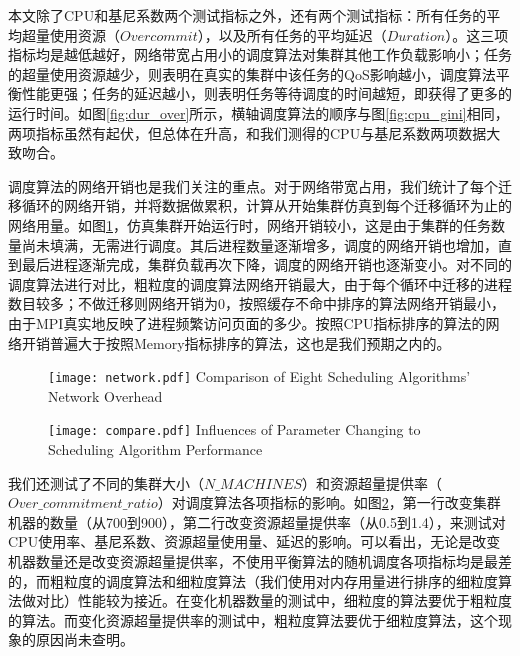 本文除了CPU和基尼系数两个测试指标之外，还有两个测试指标：所有任务的平均超量使用资源（$Overcommit$），以及所有任务的平均延迟（$Duration$）。这三项指标均是越低越好，网络带宽占用小的调度算法对集群其他工作负载影响小；任务的超量使用资源越少，则表明在真实的集群中该任务的QoS影响越小，调度算法平衡性能更强；任务的延迟越小，则表明任务等待调度的时间越短，即获得了更多的运行时间。如图\ref{fig:dur_over}所示，横轴调度算法的顺序与图\ref{fig:cpu_gini}相同，两项指标虽然有起伏，但总体在升高，和我们测得的CPU与基尼系数两项数据大致吻合。

调度算法的网络开销也是我们关注的重点。对于网络带宽占用，我们统计了每个迁移循环的网络开销，并将数据做累积，计算从开始集群仿真到每个迁移循环为止的网络用量。如图\ref{fig:minetwork}，仿真集群开始运行时，网络开销较小，这是由于集群的任务数量尚未填满，无需进行调度。其后进程数量逐渐增多，调度的网络开销也增加，直到最后进程逐渐完成，集群负载再次下降，调度的网络开销也逐渐变小。对不同的调度算法进行对比，粗粒度的调度算法网络开销最大，由于每个循环中迁移的进程数目较多；不做迁移则网络开销为0，按照缓存不命中排序的算法网络开销最小，由于MPI真实地反映了进程频繁访问页面的多少。按照CPU指标排序的算法的网络开销普遍大于按照Memory指标排序的算法，这也是我们预期之内的。
\begin{figure}[!htp]
  \centering
  \texttt{[image: network.pdf]}
    {Comparison of Eight Scheduling Algorithms' Network Overhead}
  \label{fig:minetwork}
\end{figure}

\begin{figure}[!htp]
  \centering
  \texttt{[image: compare.pdf]}
    {Influences of Parameter Changing to Scheduling Algorithm Performance}
  \label{fig:comparing}
\end{figure}

我们还测试了不同的集群大小（$N\_MACHINES$）和资源超量提供率（$Over\_commitment\_ratio$）对调度算法各项指标的影响。如图\ref{fig:comparing}，第一行改变集群机器的数量（从700到900），第二行改变资源超量提供率（从0.5到1.4），来测试对CPU使用率、基尼系数、资源超量使用量、延迟的影响。可以看出，无论是改变机器数量还是改变资源超量提供率，不使用平衡算法的随机调度各项指标均是最差的，而粗粒度的调度算法和细粒度算法（我们使用对内存用量进行排序的细粒度算法做对比）性能较为接近。在变化机器数量的测试中，细粒度的算法要优于粗粒度的算法。而变化资源超量提供率的测试中，粗粒度算法要优于细粒度算法，这个现象的原因尚未查明。

